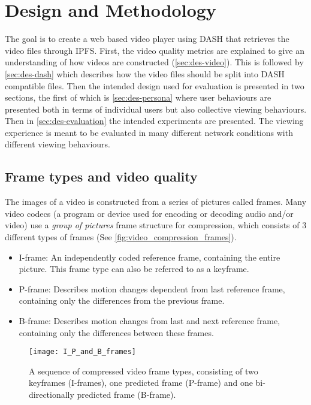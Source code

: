 \chapter{Design and Methodology}
\label{cha:design-and-method}

The goal is to create a web based video player using \ac{DASH} that retrieves the video files through \ac{IPFS}. First, the video quality metrics are explained to give an understanding of how videos are constructed (\autoref{sec:des-video}). This is followed by \autoref{sec:des-dash} which describes how the video files should be split into \ac{DASH} compatible files. Then the intended design used for evaluation is presented in two sections, the first of which is \autoref{sec:des-persona} where user behaviours are presented both in terms of individual users but also collective viewing behaviours. Then in \autoref{sec:des-evaluation} the intended experiments are presented. The viewing experience is meant to be evaluated in many different network conditions with different viewing behaviours.

\section{Frame types and video quality}
\label{sec:des-video}
The images of a video is constructed from a series of pictures called frames. Many video codecs (a program or device used for encoding or decoding audio and/or video) use a \emph{group of pictures} frame structure for compression, which consists of 3 different types of frames (See \autoref{fig:video_compression_frames}).

\begin{itemize}
    \item \ac{I-frame}: An independently coded reference frame, containing the entire picture. This frame type can also be referred to as a keyframe.
    \item \ac{P-frame}: Describes motion changes dependent from last reference frame, containing only the differences from the previous frame.
    \item \ac{B-frame}: Describes motion changes from last and next reference frame, containing only the differences between these frames.
\end{itemize}

\begin{figure}[hb]
    \myfloatalign
    \texttt{[image: I\_P\_and\_B\_frames]}
    \caption[Frame types used in video compression]{A sequence of compressed video frame types, consisting of two keyframes (\acsp{I-frame}), one predicted frame (\acs{P-frame}) and one bi-directionally predicted frame (\acs{B-frame}).}
    \label{fig:video_compression_frames}
\end{figure}

